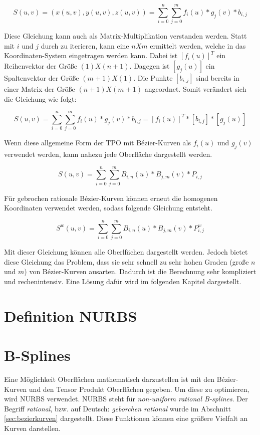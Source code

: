 \documentclass[11pt]{article}
\begin{document}
\begin{equation}
S(u,v) = (x(u,v), y(u,v), z(u,v)) = \sum_{i=0}^{n} \sum_{j=0}^{m} f_{i}(u) * g_{j}(v) * b_{i,j} 
\end{equation}

Diese Gleichung kann auch als Matrix-Multiplikation verstanden werden. 
Statt mit $i$ und $j$ durch zu iterieren, kann eine $n X m$ ermittelt werden, welche in das Koordinaten-System eingetragen werden kann.
Dabei ist $[f_{i}(u)]^{T}$ ein Reihenvektor der Größe  $(1) X (n+1)$.
Dagegen ist $[g_{j}(u)]$ ein Spaltenvektor der Größe $(m+1) X (1)$.
Die Punkte $[b_{i,j}]$ sind bereits in einer Matrix der Größe $(n+1) X (m+1)$ angeordnet. 
Somit verändert sich die Gleichung wie folgt: 

\begin{equation}
S(u,v) = \sum_{i=0}^{n} \sum_{j=0}^{m} f_{i}(u) * g_{j}(v) * b_{i,j}  = [f_{i}(u)]^{T} * [b_{i,j}] * [g_{j}(u)]
\end{equation}

Wenn diese allgemeine Form der TPO mit Bézier-Kurven als $f_{i}(u)$ und $g_{j}(v)$ verwendet werden, kann nahezu jede Oberfläche dargestellt werden. 

\begin{equation}
S(u,v) = \sum_{i=0}^{n} \sum_{j=0}^{m} B_{i,n}(u) * B_{j,m} (v) * P_{i,j}
\end{equation}

Für gebrochen rationale Bézier-Kurven können erneut die homogenen Koordinaten verwendet werden, sodass folgende Gleichung entsteht. 

\begin{equation}
S^{w}(u,v) =  \sum_{i=0}^{n} \sum_{j=0}^{m} B_{i,n}(u) * B_{j,m} (v) * P^{w}_{i,j}
\end{equation}

Mit dieser Gleichung können alle Oberlfächen dargestellt werden. 
Jedoch bietet diese Gleichung das Problem, dass sie sehr schnell zu sehr hohen Graden (große $n$ und $m$) von Bézier-Kurven ausarten.
Dadurch ist die Berechnung sehr kompliziert und rechenintensiv. 
Eine Lösung dafür wird im folgenden Kapitel dargestellt. 

\section{Definition NURBS}
\label{sec:definitionnurbs}
\section{B-Splines}
\label{sec:bsplines}
Eine Möglichkeit Oberflächen mathematisch darzustellen ist mit den Bézier-Kurven und den Tensor Produkt Oberflächen gegeben.
Um diese zu optimieren, wird NURBS verwendet.
NURBS steht für \emph{non-uniform rational B-splines}.
Der Begriff \emph{rational}, bzw. auf Deutsch: \emph{geborchen rational} wurde im Abschnitt \ref{sec:bezierkurven} dargestellt. 
Diese Funktionen können eine größere Vielfalt an Kurven darstellen. 
\end{document}
